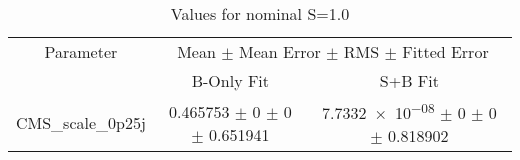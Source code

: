 \begin{table}
\centering
\caption{Values for nominal S=1.0}
\begin{tabular}{ccc}
\toprule
Parameter 	& \multicolumn{2}{c}{Mean $\pm$ Mean Error $\pm$ RMS $\pm$ Fitted Error}\\
 	& B-Only Fit & S+B Fit\\
\midrule
CMS\_scale\_0p25j 	& \num{0.465753} $\pm$ \num{0} $\pm$ \num{0} $\pm$ \num{0.651941} 	& \num{7.7332e-08} $\pm$ \num{0} $\pm$ \num{0} $\pm$ \num{0.818902}\\
\bottomrule
\end{tabular}
\end{table}